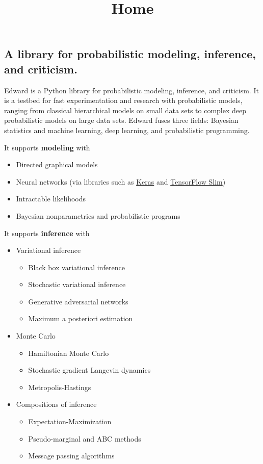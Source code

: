 \title{Home}

\subsection{A library for probabilistic modeling, inference, and criticism.}

Edward is a Python library for probabilistic modeling, inference, and
criticism. It is a testbed for fast experimentation and research with
probabilistic models, ranging from classical hierarchical models on
small data sets to complex deep probabilistic models on large data
sets. Edward fuses three fields: Bayesian statistics and machine
learning, deep learning, and probabilistic programming.

It supports \textbf{modeling} with

\begin{itemize}
\item Directed graphical models
\item Neural networks (via libraries such as
  \href{http://keras.io}{Keras} and
  \href{https://github.com/tensorflow/tensorflow/tree/master/tensorflow/contrib/slim}{TensorFlow
  Slim})
\item Intractable likelihoods
\item Bayesian nonparametrics and probabilistic programs
\end{itemize}

It supports \textbf{inference} with

\begin{itemize}
\item Variational inference
  \begin{itemize}
    \item Black box variational inference
    \item Stochastic variational inference
    \item Generative adversarial networks
    \item Maximum a posteriori estimation
  \end{itemize}
\item Monte Carlo
  \begin{itemize}
    \item Hamiltonian Monte Carlo
    \item Stochastic gradient Langevin dynamics
    \item Metropolis-Hastings
  \end{itemize}
\item Compositions of inference
  \begin{itemize}
    \item Expectation-Maximization
    \item Pseudo-marginal and ABC methods
    \item Message passing algorithms
  \end{itemize}
\end{itemize}

